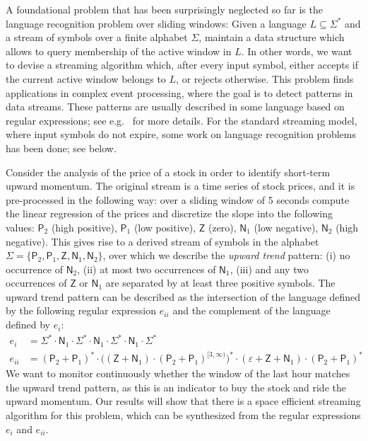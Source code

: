 \documentclass{article}\usepackage[a4paper,margin=20mm]{geometry}
\begin{document}
A foundational problem that has been surprisingly neglected
so far is the language recognition problem over sliding windows:
Given a language $L \subseteq \Sigma^*$ and a stream of symbols over a finite alphabet $\Sigma$,
maintain a data structure which allows to query membership
of the active window in $L$.
In other words, we want to devise a streaming algorithm
which, after every input symbol, either accepts if the current active window belongs to $L$,
or rejects otherwise. This problem finds applications in complex event processing, where
the goal is to detect patterns in data streams. These patterns are usually described in some 
language based on regular expressions; see e.g.~\cite{CuMa12,ZhangDI14} for more details. 
For the standard streaming model, where input symbols do not expire,
some work on language recognition problems has been done; see  below.

\newcommand{\SP}{\textsf{P}}
\newcommand{\SZ}{\textsf{Z}}
\newcommand{\SN}{\textsf{N}}

\begin{example} 
Consider the analysis of the price of a stock in order to identify short-term upward momentum.
The original stream is a time series of stock prices, and it is pre-processed in the following way:
over a sliding window of 5 seconds compute the linear regression of the prices and discretize the slope
into the following values: $\SP_2$ (high positive), $\SP_1$ (low positive), $\SZ$ (zero), $\SN_1$ (low negative),
$\SN_2$ (high negative). This gives rise to a derived stream of symbols in the alphabet $\Sigma = \{\SP_2,\SP_1,\SZ,\SN_1,\SN_2\}$,
over which we describe the {\em upward trend} pattern:
(i) no occurrence of $\SN_2$,
(ii) at most two occurrences of $\SN_1$,
(iii) and any two occurrences of $\SZ$ or $\SN_1$ are separated by at least three positive symbols.
The upward trend pattern can be described as the intersection of the language defined 
 by the following regular expression $e_{ii}$ and the complement of the language
 defined by  $e_{i}$:
\begin{align*}
	e_{i} &= \Sigma^* \cdot \SN_1 \cdot \Sigma^* \cdot \SN_1 \cdot \Sigma^* \cdot \SN_1 \cdot \Sigma^* \\
	e_{ii} &= (\SP_2 + \SP_1)^* \cdot \big( (\SZ + \SN_1) \cdot (\SP_2 + \SP_1)^{[3,\infty)} \big)^* \cdot (\varepsilon + \SZ + \SN_1) \cdot (\SP_2 + \SP_1)^*
\end{align*}
We want to monitor continuously whether the window of the last hour matches the upward trend pattern,
as this is an indicator to buy the stock and ride the upward momentum.
Our results will show that there is a space efficient streaming algorithm for this problem,
which can be synthesized from the regular expressions $e_i$ and $e_{ii}$.
\end{example}
\end{document}

